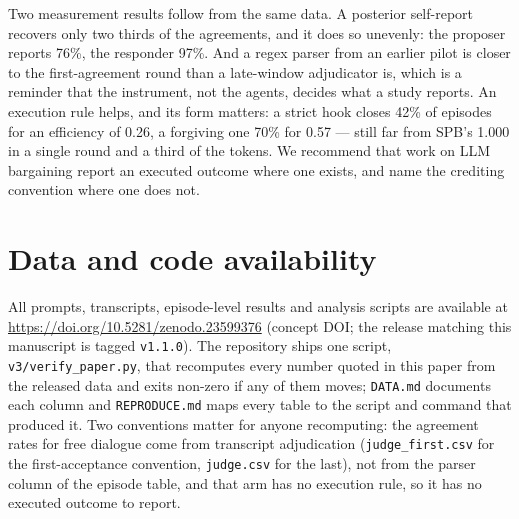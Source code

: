 \documentclass[11pt]{article}
\begin{document}
Two measurement results follow from the same data. A posterior self-report recovers only two thirds of the agreements, and it does so unevenly: the proposer reports 76\%, the responder 97\%. And a regex parser from an earlier pilot is closer to the first-agreement round than a late-window adjudicator is, which is a reminder that the instrument, not the agents, decides what a study reports. An execution rule helps, and its form matters: a strict hook closes 42\% of episodes for an efficiency of 0.26, a forgiving one 70\% for 0.57 --- still far from SPB's 1.000 in a single round and a third of the tokens. We recommend that work on LLM bargaining report an executed outcome where one exists, and name the crediting convention where one does not.

\section*{Data and code availability}
All prompts, transcripts, episode-level results and analysis scripts are available at \url{https://doi.org/10.5281/zenodo.23599376} (concept DOI; the release matching this manuscript is tagged \texttt{v1.1.0}). The repository ships one script, \texttt{v3/verify\_paper.py}, that recomputes every number quoted in this paper from the released data and exits non-zero if any of them moves; \texttt{DATA.md} documents each column and \texttt{REPRODUCE.md} maps every table to the script and command that produced it. Two conventions matter for anyone recomputing: the agreement rates for free dialogue come from transcript adjudication (\texttt{judge\_first.csv} for the first-acceptance convention, \texttt{judge.csv} for the last), not from the parser column of the episode table, and that arm has no execution rule, so it has no executed outcome to report.
\end{document}
